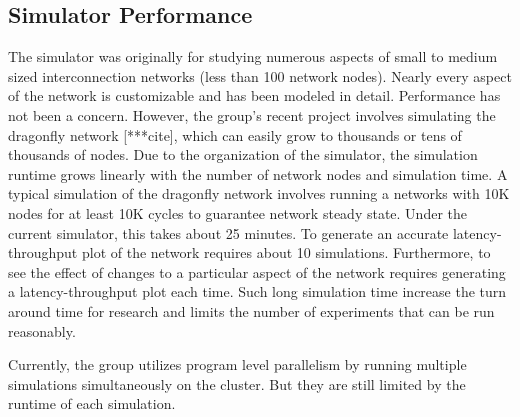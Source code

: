 \subsection{Simulator Performance}
The simulator was originally for studying numerous aspects of small to medium sized interconnection networks (less than 100 network nodes). Nearly every aspect of the network is customizable and has been modeled in detail. Performance has not been a concern. However, the group's recent project involves simulating the dragonfly network [***cite], which can easily grow to thousands or tens of thousands of nodes. Due to the organization of the simulator, the simulation runtime grows linearly with the number of network nodes and simulation time. A typical simulation of the dragonfly network involves running a networks with 10K nodes for at least 10K cycles to guarantee network steady state. Under the current simulator, this takes about 25 minutes. To generate an accurate latency-throughput plot of the network requires about 10 simulations. Furthermore, to see the effect of changes to a particular aspect of the network requires generating a latency-throughput plot each time. Such long simulation time increase the turn around time for research and limits the number of experiments that can be run reasonably. 

Currently, the group utilizes program level parallelism by running multiple simulations simultaneously on the cluster. But they are still limited by the runtime of each simulation. 

